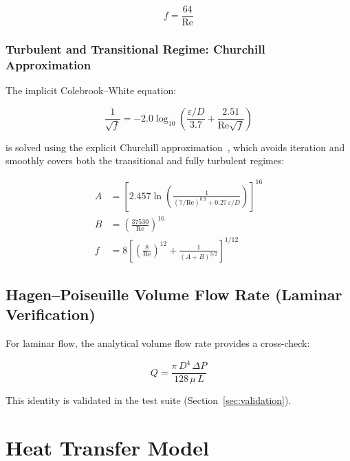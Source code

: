 \documentclass[11pt]{article}
\begin{document}
\begin{equation}
  f = \frac{64}{\mathrm{Re}}
  \label{eq:laminar-friction}
\end{equation}

\subsubsection{Turbulent and Transitional Regime: Churchill Approximation}

The implicit Colebrook--White equation:

\begin{equation}
  \frac{1}{\sqrt{f}} = -2.0 \log_{10}
    \!\left(\frac{\varepsilon/D}{3.7} + \frac{2.51}{\mathrm{Re}\sqrt{f}}\right)
  \label{eq:colebrook}
\end{equation}

is solved using the explicit Churchill approximation~\cite{churchill1977},
which avoids iteration and smoothly covers both the transitional and
fully turbulent regimes:

\begin{align}
  A &= \left[2.457 \ln\!\left(\frac{1}{(7/\mathrm{Re})^{0.9}
       + 0.27\,\varepsilon/D}\right)\right]^{16} \\
  B &= \left(\frac{37530}{\mathrm{Re}}\right)^{16} \\
  f &= 8\left[\left(\frac{8}{\mathrm{Re}}\right)^{12}
       + \frac{1}{(A+B)^{3/2}}\right]^{1/12}
  \label{eq:churchill}
\end{align}

\subsection{Hagen--Poiseuille Volume Flow Rate (Laminar Verification)}

For laminar flow, the analytical volume flow rate provides a cross-check:

\begin{equation}
  Q = \frac{\pi \, D^4 \, \Delta P}{128 \, \mu \, L}
  \label{eq:hagen-poiseuille}
\end{equation}

This identity is validated in the test suite (Section~\ref{sec:validation}).

\section{Heat Transfer Model}
\end{document}
